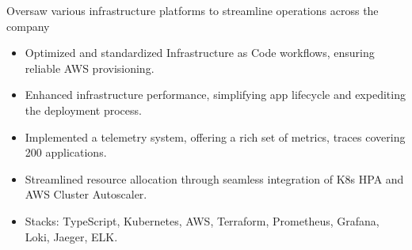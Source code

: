 \documentclass{resume}
\begin{document}
Oversaw various infrastructure platforms to streamline operations across the company
\begin{itemize}
  \item Optimized and standardized Infrastructure as Code workflows, ensuring reliable AWS provisioning.
  \item Enhanced infrastructure performance, simplifying app lifecycle and expediting the deployment process.
  \item Implemented a telemetry system, offering a rich set of metrics, traces covering 200 applications.
  \item Streamlined resource allocation through seamless integration of K8s HPA and AWS Cluster Autoscaler.
  \item Stacks: TypeScript, Kubernetes, AWS, Terraform, Prometheus, Grafana, Loki, Jaeger, ELK.
\end{itemize}

\end{document}
